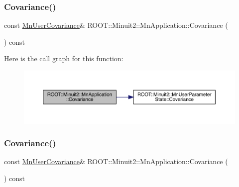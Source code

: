 \mbox{\label{classROOT_1_1Minuit2_1_1MnApplication_abd83494a6b9b808683edc162c28a9888}} 
\subsubsection{\texorpdfstring{Covariance()}{Covariance()}\hspace{0.1cm}{\footnotesize\ttfamily [1/2]}}
{\footnotesize\ttfamily const \mbox{\hyperlink{classROOT_1_1Minuit2_1_1MnUserCovariance}{Mn\+User\+Covariance}}\& R\+O\+O\+T\+::\+Minuit2\+::\+Mn\+Application\+::\+Covariance (\begin{DoxyParamCaption}{ }\end{DoxyParamCaption}) const\hspace{0.3cm}{\ttfamily [inline]}}

Here is the call graph for this function\+:
\nopagebreak
\begin{figure}[H]
\begin{center}
\leavevmode
\includegraphics[width=350pt]{df/dd5/classROOT_1_1Minuit2_1_1MnApplication_abd83494a6b9b808683edc162c28a9888_cgraph}
\end{center}
\end{figure}
\mbox{\label{classROOT_1_1Minuit2_1_1MnApplication_abd83494a6b9b808683edc162c28a9888}} 
\subsubsection{\texorpdfstring{Covariance()}{Covariance()}\hspace{0.1cm}{\footnotesize\ttfamily [2/2]}}
{\footnotesize\ttfamily const \mbox{\hyperlink{classROOT_1_1Minuit2_1_1MnUserCovariance}{Mn\+User\+Covariance}}\& R\+O\+O\+T\+::\+Minuit2\+::\+Mn\+Application\+::\+Covariance (\begin{DoxyParamCaption}{ }\end{DoxyParamCaption}) const\hspace{0.3cm}{\ttfamily [inline]}}

